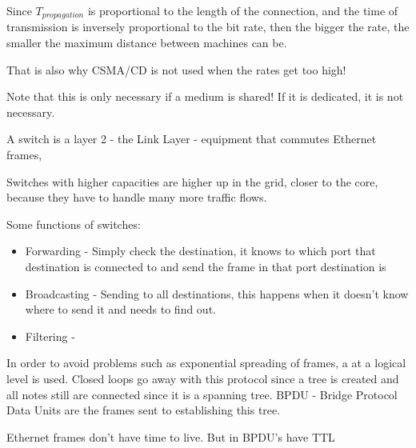 
Since $T_{propagation}$ is proportional to the length of the connection, and the time of transmission is inversely proportional to the bit rate, then the bigger the rate, the smaller the maximum distance between machines can be. 

That is also why CSMA/CD is not used when the rates get too high!



Note that this is only necessary if a medium is shared! If it is dedicated, it is not necessary.


A switch is a layer 2 - the Link Layer - equipment that commutes Ethernet frames,

Switches with higher capacities are higher up in the grid, closer to the core, because they have to handle many more traffic flows.

Some functions of switches:
\begin{itemize}
    \item Forwarding - Simply check the destination, it knows to which port that destination is connected to and send the frame in that port destination is 
    \item Broadcasting - Sending to all destinations, this happens when it doesn't know where to send it and needs to find out. 
    \item Filtering - 
\end{itemize} 

In order to avoid problems such as exponential spreading of frames, a  at a logical level is used. Closed loops go away with this protocol since a tree is created and all notes still are connected since it is a spanning tree. BPDU - Bridge Protocol Data Units are the frames sent to establishing this tree.


Ethernet frames don't have time to live. But in BPDU's have TTL 


